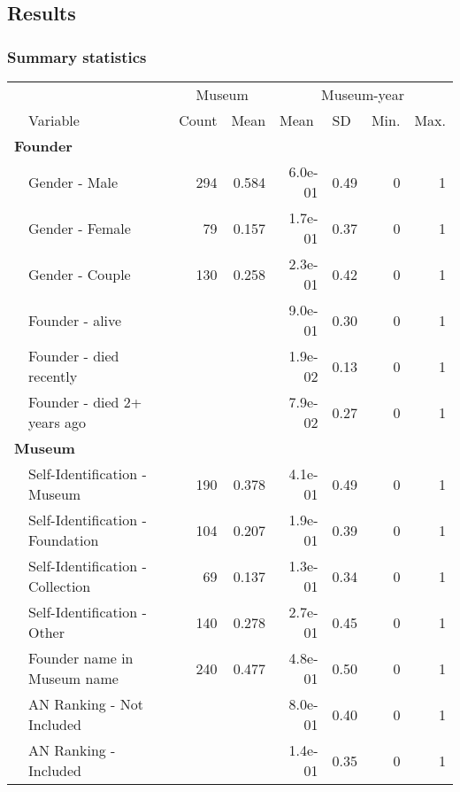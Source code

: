 \documentclass[12pt]{article}
\begin{document}
\subsection*{Results}


\subsubsection*{Summary statistics}


\begin{table}[ht]
\centering
\begin{tabular}{llrrrrrr}
  \hline
 & & \multicolumn{2}{c}{Museum} & \multicolumn{4}{c}{Museum-year} \\ 
\cmidrule(r){3-4}\cmidrule(r){5-8} \multicolumn{1}{l}{} & \multicolumn{1}{l}{Variable} & \multicolumn{1}{l}{Count} & \multicolumn{1}{l}{Mean} & \multicolumn{1}{l}{Mean} & \multicolumn{1}{l}{SD} & \multicolumn{1}{l}{Min.} & \multicolumn{1}{l}{Max.}\\ 
 \hline
  \multicolumn{8}{l}{\textbf{Founder}} \\ 
 & Gender - Male & 294 & 0.584 & 6.0e-01 &  0.49 & 0 & 1 \\ 
   & Gender - Female & 79 & 0.157 & 1.7e-01 &  0.37 & 0 & 1 \\ 
   & Gender - Couple & 130 & 0.258 & 2.3e-01 &  0.42 & 0 & 1 \\ 
   & Founder - alive &  &  & 9.0e-01 &  0.30 & 0 & 1 \\ 
   & Founder - died recently &  &  & 1.9e-02 &  0.13 & 0 & 1 \\ 
   & Founder - died 2+ years ago &  &  & 7.9e-02 &  0.27 & 0 & 1 \\ 
   \multicolumn{8}{l}{\textbf{Museum}} \\ 
 & Self-Identification - Museum & 190 & 0.378 & 4.1e-01 &  0.49 & 0 & 1 \\ 
   & Self-Identification - Foundation & 104 & 0.207 & 1.9e-01 &  0.39 & 0 & 1 \\ 
   & Self-Identification - Collection & 69 & 0.137 & 1.3e-01 &  0.34 & 0 & 1 \\ 
   & Self-Identification - Other & 140 & 0.278 & 2.7e-01 &  0.45 & 0 & 1 \\ 
   & Founder name in Museum name & 240 & 0.477 & 4.8e-01 &  0.50 & 0 & 1 \\ 
   & AN Ranking - Not Included &  &  & 8.0e-01 &  0.40 & 0 & 1 \\ 
   & AN Ranking - Included &  &  & 1.4e-01 &  0.35 & 0 & 1 \\ 

\end{tabular}
\end{table}
\end{document}
